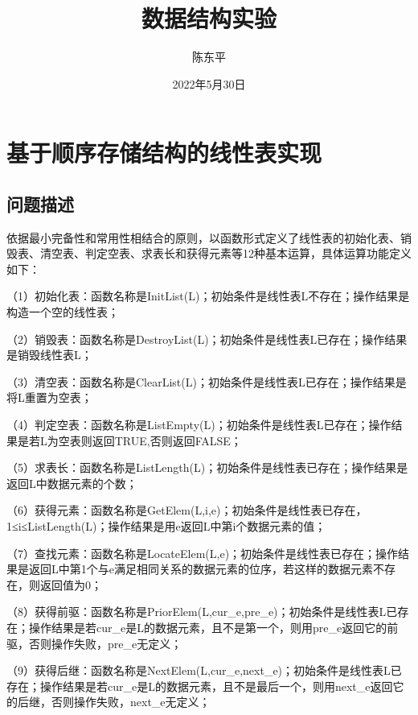 \documentclass[supercite]{Experimental_Report}
\title{~~~~~~数据结构实验~~~~~~}
\author{陈东平}
\date{2022年5月30日}
\theoremstyle{definition}
\begin{document}
\maketitle

\clearpage


\tableofcontents[level=2]

\clearpage


\section{基于顺序存储结构的线性表实现}

\subsection{问题描述}
依据最小完备性和常用性相结合的原则，以函数形式定义了线性表的初始化表、销毁表、清空表、判定空表、求表长和获得元素等12种基本运算，具体运算功能定义如下：

（1）初始化表：函数名称是InitList(L)；初始条件是线性表L不存在；操作结果是构造一个空的线性表；

（2）销毁表：函数名称是DestroyList(L)；初始条件是线性表L已存在；操作结果是销毁线性表L；

（3）清空表：函数名称是ClearList(L)；初始条件是线性表L已存在；操作结果是将L重置为空表；

（4）判定空表：函数名称是ListEmpty(L)；初始条件是线性表L已存在；操作结果是若L为空表则返回TRUE,否则返回FALSE；

（5）求表长：函数名称是ListLength(L)；初始条件是线性表已存在；操作结果是返回L中数据元素的个数；

（6）获得元素：函数名称是GetElem(L,i,e)；初始条件是线性表已存在，1≤i≤ListLength(L)；操作结果是用e返回L中第i个数据元素的值；

（7）查找元素：函数名称是LocateElem(L,e)；初始条件是线性表已存在；操作结果是返回L中第1个与e满足相同关系的数据元素的位序，若这样的数据元素不存在，则返回值为0；

（8）获得前驱：函数名称是PriorElem(L,cur\_e,pre\_e)；初始条件是线性表L已存在；操作结果是若cur\_e是L的数据元素，且不是第一个，则用pre\_e返回它的前驱，否则操作失败，pre\_e无定义；

（9）获得后继：函数名称是NextElem(L,cur\_e,next\_e)；初始条件是线性表L已存在；操作结果是若cur\_e是L的数据元素，且不是最后一个，则用next\_e返回它的后继，否则操作失败，next\_e无定义；
\end{document}
